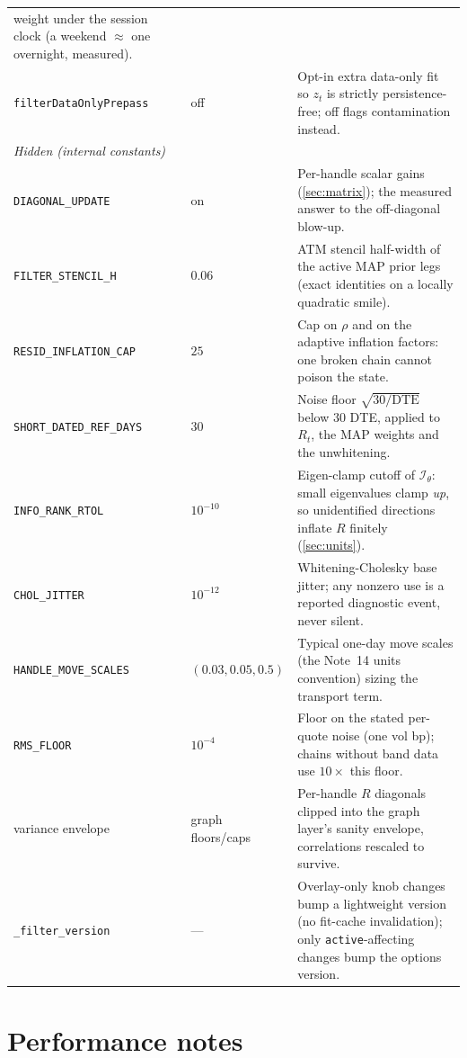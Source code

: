 \documentclass[11pt]{article}
\newcommand{\calI}{\mathcal I}
\begin{document}
\begin{longtable}{p{}p{}p{}}
weight under the session clock (a weekend $\approx$ one overnight,
measured).\\
\texttt{filterDataOnlyPrepass} & off & Opt-in extra data-only fit so
$z_t$ is strictly persistence-free; off flags contamination instead.\\
\midrule
\multicolumn{3}{l}{\emph{Hidden (internal constants)}}\\ \midrule
\texttt{DIAGONAL\_UPDATE} & on & Per-handle scalar gains
(\cref{sec:matrix}); the measured answer to the off-diagonal blow-up.\\
\texttt{FILTER\_STENCIL\_H} & $0.06$ & ATM stencil half-width of the
active MAP prior legs (exact identities on a locally quadratic
smile).\\
\texttt{RESID\_INFLATION\_CAP} & $25$ & Cap on $\rho$ and on the
adaptive inflation factors: one broken chain cannot poison the state.\\
\texttt{SHORT\_DATED\_REF\_DAYS} & $30$ & Noise floor
$\sqrt{30/\mathrm{DTE}}$ below $30$ DTE, applied to $R_t$, the MAP
weights and the unwhitening.\\
\texttt{INFO\_RANK\_RTOL} & $10^{-10}$ & Eigen-clamp cutoff of
$\calI_\theta$: small eigenvalues clamp \emph{up}, so unidentified
directions inflate $R$ finitely (\cref{sec:units}).\\
\texttt{CHOL\_JITTER} & $10^{-12}$ & Whitening-Cholesky base jitter;
any nonzero use is a reported diagnostic event, never silent.\\
\texttt{HANDLE\_MOVE\_SCALES} & $(0.03,0.05,0.5)$ & Typical one-day
move scales (the Note~14 units convention) sizing the transport term.\\
\texttt{RMS\_FLOOR} & $10^{-4}$ & Floor on the stated per-quote noise
(one vol bp); chains without band data use $10\times$ this floor.\\
variance envelope & graph floors/caps & Per-handle $R$ diagonals
clipped into the graph layer's sanity envelope, correlations rescaled
to survive.\\
\texttt{\_filter\_version} & --- & Overlay-only knob changes bump a
lightweight version (no fit-cache invalidation); only
\texttt{active}-affecting changes bump the options version.\\
\bottomrule
\end{longtable}
\endgroup

\section{Performance notes}
\label{app:perf}
\end{document}
